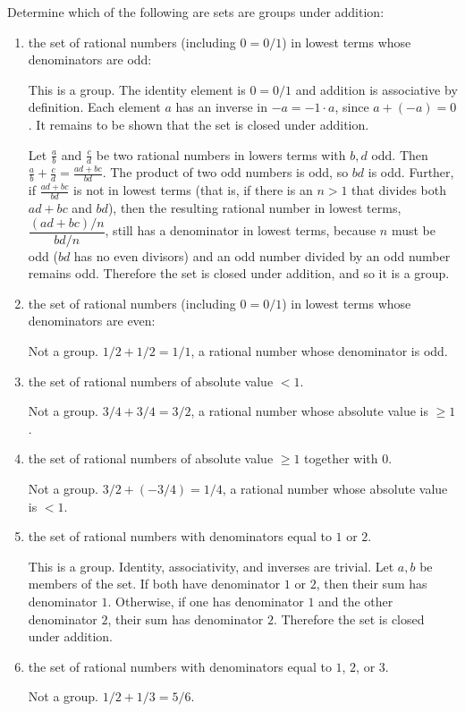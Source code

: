 \documentclass{article}
\begin{document}
Determine which of the following are sets are groups under addition:

\begin{enumerate}[label=(\alph*)]
      \item the set of rational numbers (including $0 = 0/1$) in lowest terms whose denominators are odd:
      
            This is a group. The identity element is $0 = 0/1$ and addition is associative by definition. Each element $a$ has an inverse in $-a = -1 \cdot a$, since $a + (-a) = 0$. It remains to be shown that the set is closed under addition. 
            
            Let $\frac{a}{b}$ and $\frac{c}{d}$ be two rational numbers in lowers terms with $b, d$ odd. Then $\frac{a}{b} + \frac{c}{d} = \frac{ad + bc}{bd}$. The product of two odd numbers is odd, so $bd$ is odd. Further, if $\frac{ad + bc}{bd}$ is not in lowest terms (that is, if there is an $n > 1$ that divides both $ad + bc$ and $bd$), then the resulting rational number in lowest terms, $\dfrac{(ad + bc)/n}{bd/n}$, still has a denominator in lowest terms, because $n$ must be odd ($bd$ has no even divisors) and an odd number divided by an odd number remains odd. Therefore the set is closed under addition, and so it is a group.
      \item the set of rational numbers (including $0 = 0/1$) in lowest terms whose denominators are even:

            Not a group. $1/2 + 1/2 = 1/1$, a rational number whose denominator is odd.
      \item the set of rational numbers of absolute value $< 1$.

            Not a group. $3/4 + 3/4 = 3/2$, a rational number whose absolute value is $\geq 1$.
      \item the set of rational numbers of absolute value $\geq 1$ together with $0$.

            Not a group. $3/2 + (-3/4) = 1/4$, a rational number whose absolute value is $< 1$. 
      \item the set of rational numbers with denominators equal to $1$ or $2$.

            This is a group. Identity, associativity, and inverses are trivial. Let $a, b$ be members of the set. If both have denominator $1$ or $2$, then their sum has denominator $1$. Otherwise, if one has denominator $1$ and the other denominator $2$, their sum has denominator $2$. Therefore the set is closed under addition.
      \item the set of rational numbers with denominators equal to $1$, $2$, or $3$.

            Not a group. $1/2 + 1/3 = 5/6$.
\end{enumerate}
\end{document}
